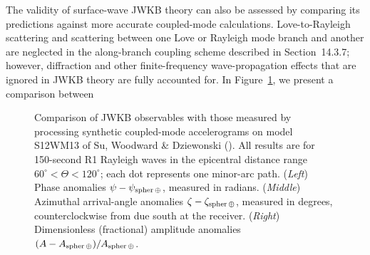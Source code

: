The validity of surface-wave JWKB theory can also be assessed
by comparing its predictions against more accurate coupled-mode
calculations.  Love-to-Rayleigh scattering and scattering
between one Love or Rayleigh mode branch and another are
neglected in the along-branch coupling scheme described in
Section~14.3.7; however, diffraction and other finite-frequency
wave-propagation effects that are
ignored in JWKB theory are fully accounted for.
In Figure~\ref{fig:16.JWKB_CM}, we present a comparison between
\begin{figure}[!b]
\begin{center}
\end{center}
\caption[JWKB_CM]{\label{fig:16.JWKB_CM}
Comparison of JWKB observables with those measured
by processing synthetic coupled-mode accelerograms
on model S12WM13 of Su, Woodward \& Dziewonski
(\citeyear{su&al94}).  All results are for 150-second
R1 Rayleigh waves in the epicentral distance range
$60^\circ<\Theta<120^\circ$; each dot represents
one minor-arc path.  ({\em Left\/}) Phase anomalies
$\psi-\psi_{\rm spher\,\oplus}$, measured in radians.
({\em Middle\/}) Azimuthal arrival-angle anomalies
$\zeta-\zeta_{\rm spher\,\oplus}$, measured in degrees,
counterclockwise from due south at the receiver.
({\em Right\/}) Dimensionless (fractional) amplitude anomalies
$(A-A_{\rm spher\,\oplus})/A_{\rm spher\,\oplus}$.}
\end{figure}

